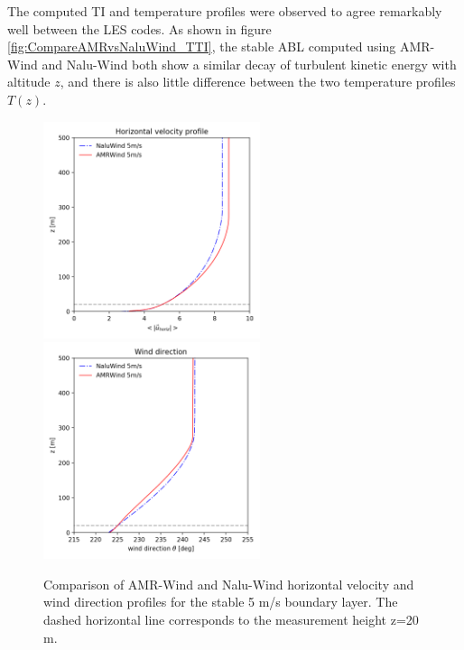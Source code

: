 The computed TI and temperature profiles were observed to agree
remarkably well between the LES codes. As shown in figure
\ref{fig:CompareAMRvsNaluWind_TTI}, the stable ABL computed using
AMR-Wind and Nalu-Wind both show a similar decay of turbulent kinetic
energy with altitude $z$, and there is also little difference between
the two temperature profiles $T(z)$.

\begin{figure} %
  \centering
  \includegraphics[width=2.5in]{figures/Compare_AMRWind_NaluWind/AMRWind_NaluWind_stable_05ms_mesh2p5_2p5_2p5_WS.png}
  \includegraphics[width=2.5in]{figures/Compare_AMRWind_NaluWind/AMRWind_NaluWind_stable_05ms_mesh2p5_2p5_2p5_Wdir.png}\\
  \caption{\label{fig:CompareAMRvsNaluWind_WSDir} Comparison of
    AMR-Wind and Nalu-Wind horizontal velocity and wind direction
    profiles for the stable 5 m/s boundary layer. The dashed
    horizontal line corresponds to the measurement height z=20 m. }
\end{figure}

